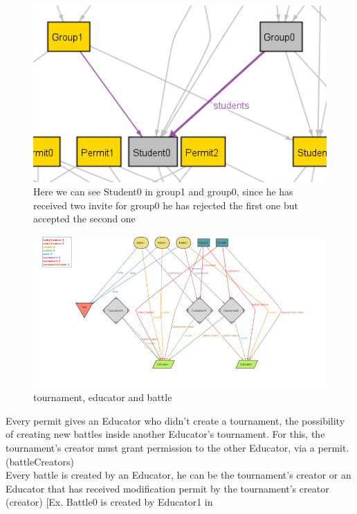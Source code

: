 \documentclass{article}
\begin{document}
{\begin{figure}[H]
    \centering
    \includegraphics{images/ALLOY/students.png}
    \caption{Here we can see Student0 in group1 and group0, since he has received two invite for group0 he has rejected the first one but accepted the second one}
    \label{fig:receivingAcceptingRefusingInvite}
\end{figure}
\begin{figure}[H]
    \centering
    \hspace*{-3cm}\includegraphics[scale=1.3]{images/ALLOY/Picture2.png}
    \caption{tournament, educator and battle}
    \label{fig:tournament, Educator and battle}
\end{figure}
\color{red}
Every permit gives an Educator who didn't create a tournament, the possibility of creating new battles inside another Educator's tournament.
For this, the tournament's creator must grant permission to the other Educator, via a permit. (battleCreators)\\
\color{orange}
Every battle is created by an Educator, he can be the tournament's creator or an Educator that has received 
modification permit by the tournament's creator (creator) [Ex. Battle0 is created by Educator1 in 
}
\end{document}
